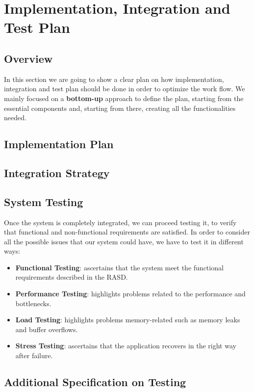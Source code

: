 \documentclass{article}
\begin{document}
\section{Implementation, Integration and Test Plan}
	\subsection{Overview}
	In this section we are going to show a clear plan on how implementation, integration and test plan should be done in order to optimize the work flow.
	We mainly focused on a \textbf{bottom-up} approach to define the plan, starting from the essential components and, starting from there, creating all the functionalities needed.
	\subsection{Implementation Plan}
	
	\subsection{Integration Strategy}
	\subsection{System Testing}
	Once the system is completely integrated, we can proceed testing it, to verify that functional and non-functional requirements are satisfied.
	In order to consider all the possible issues that our system could have, we have to test it in different ways:
	\begin{itemize}
		\item \textbf{Functional Testing}: ascertains that the system meet the functional requirements described in the RASD.
		\item \textbf{Performance Testing}: highlights problems related to the performance and bottlenecks.
		\item \textbf{Load Testing}: highlights problems memory-related such as memory leaks and buffer overflows.
		\item \textbf{Stress Testing}: ascertains that the application recovers in the right way after failure.
	\end{itemize}
		
	\subsection{Additional Specification on Testing}
	
\end{document}
